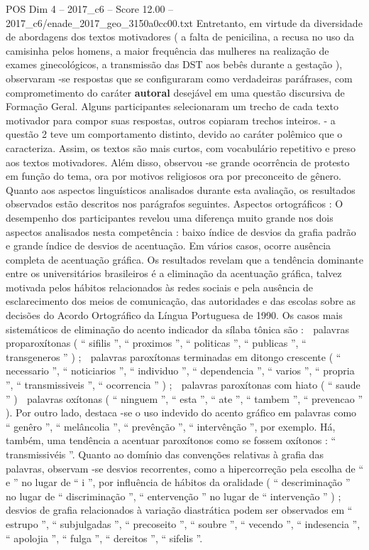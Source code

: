 \begin{textsample}{POS Dim 4 – 2017\_c6 – Score 12.00 – 2017\_c6/enade\_2017\_geo\_3150a0cc00.txt}
Entretanto, em virtude da diversidade de abordagens dos textos motivadores ( a falta de penicilina, a recusa no uso da camisinha pelos homens, a maior frequência das mulheres na realização de exames ginecológicos, a transmissão das DST aos bebês durante a gestação ), observaram -se respostas que se configuraram como verdadeiras paráfrases, com comprometimento do caráter \textbf{autoral} desejável em uma questão discursiva de Formação Geral.
Alguns participantes selecionaram um trecho de cada texto motivador para compor suas respostas, outros copiaram trechos inteiros. - a questão 2 teve um comportamento distinto, devido ao caráter polêmico que o caracteriza.
Assim, os textos são mais curtos, com vocabulário repetitivo e preso aos textos motivadores.
Além disso, observou -se grande ocorrência de protesto em função do tema, ora por motivos religiosos ora por preconceito de gênero.
Quanto aos aspectos linguísticos analisados durante esta avaliação, os resultados observados estão descritos nos parágrafos seguintes.
Aspectos ortográficos : O desempenho dos participantes revelou uma diferença muito grande nos dois aspectos analisados nesta competência : baixo índice de desvios da grafia padrão e grande índice de desvios de acentuação.
Em vários casos, ocorre ausência completa de acentuação gráfica.
Os resultados revelam que a tendência dominante entre os universitários brasileiros é a eliminação da acentuação gráfica, talvez motivada pelos hábitos relacionados às redes sociais e pela ausência de esclarecimento dos meios de comunicação, das autoridades e das escolas sobre as decisões do Acordo Ortográfico da Língua Portuguesa de 1990.
Os casos mais sistemáticos de eliminação do acento indicador da sílaba tônica são :  palavras proparoxítonas ( “ sifilis ”, “ proximos ”, “ politicas ”, “ publicas ”, “ transgeneros ” ) ;  palavras paroxítonas terminadas em ditongo crescente ( “ necessario ”, “ noticiarios ”, “ individuo ”, “ dependencia ”, “ varios ”, “ propria ”, “ transmissiveis ”, “ ocorrencia ” ) ;  palavras paroxítonas com hiato ( “ saude ” )  palavras oxítonas ( “ ninguem ”, “ esta ”, “ ate ”, “ tambem ”, “ prevencao ” ).
Por outro lado, destaca -se o uso indevido do acento gráfico em palavras como “ genêro ”, “ melâncolia ”, “ prevênção ”, “ intervênção ”, por exemplo.
Há, também, uma tendência a acentuar paroxítonos como se fossem oxítonos : “ transmissivéis ”.
Quanto ao domínio das convenções relativas à grafia das palavras, observam -se desvios recorrentes, como a hipercorreção pela escolha de “ e ” no lugar de “ i ”, por influência de hábitos da oralidade ( “ descriminação ” no lugar de “ discriminação ”, “ entervenção ” no lugar de “ intervenção ” ) ; desvios de grafia relacionados à variação diastrática podem ser observados em “ estrupo ”, “ subjulgadas ”, “ precoseito ”, “ soubre ”, “ vecendo ”, “ indesencia ”, “ apolojia ”, “ fulga ”, “ dereitos ”, “ sifelis ”.

\end{textsample}
